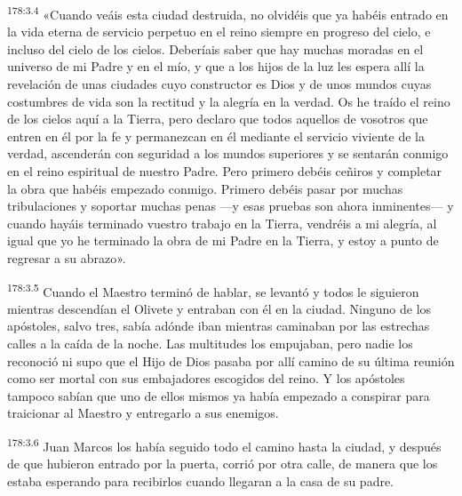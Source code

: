 \par 
\textsuperscript{178:3.4} «Cuando veáis esta ciudad destruida, no olvidéis que ya habéis entrado en la vida eterna de servicio perpetuo en el reino siempre en progreso del cielo, e incluso del cielo de los cielos. Deberíais saber que hay muchas moradas en el universo de mi Padre y en el mío, y que a los hijos de la luz les espera allí la revelación de unas ciudades cuyo constructor es Dios y de unos mundos cuyas costumbres de vida son la rectitud y la alegría en la verdad. Os he traído el reino de los cielos aquí a la Tierra, pero declaro que todos aquellos de vosotros que entren en él por la fe y permanezcan en él mediante el servicio viviente de la verdad, ascenderán con seguridad a los mundos superiores y se sentarán conmigo en el reino espiritual de nuestro Padre. Pero primero debéis ceñiros y completar la obra que habéis empezado conmigo. Primero debéis pasar por muchas tribulaciones y soportar muchas penas ---y esas pruebas son ahora inminentes--- y cuando hayáis terminado vuestro trabajo en la Tierra, vendréis a mi alegría, al igual que yo he terminado la obra de mi Padre en la Tierra, y estoy a punto de regresar a su abrazo».

\par 
\textsuperscript{178:3.5} Cuando el Maestro terminó de hablar, se levantó y todos le siguieron mientras descendían el Olivete y entraban con él en la ciudad. Ninguno de los apóstoles, salvo tres, sabía adónde iban mientras caminaban por las estrechas calles a la caída de la noche. Las multitudes los empujaban, pero nadie los reconoció ni supo que el Hijo de Dios pasaba por allí camino de su última reunión como ser mortal con sus embajadores escogidos del reino. Y los apóstoles tampoco sabían que uno de ellos mismos ya había empezado a conspirar para traicionar al Maestro y entregarlo a sus enemigos.

\par 
\textsuperscript{178:3.6} Juan Marcos los había seguido todo el camino hasta la ciudad, y después de que hubieron entrado por la puerta, corrió por otra calle, de manera que los estaba esperando para recibirlos cuando llegaran a la casa de su padre.